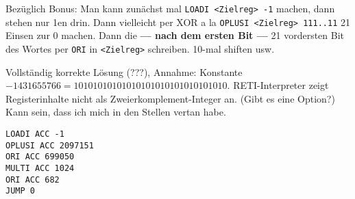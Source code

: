 \begin{solution}
Bezüglich Bonus: Man kann zunächst mal \texttt{LOADI <Zielreg> -1} machen, dann stehen nur 1en drin.
Dann vielleicht per XOR a la \texttt{OPLUSI <Zielreg> 111..11} 21 Einsen zur 0 machen.
Dann die \textbf{--- nach dem ersten Bit ---} 21 vordersten Bit des Wortes per \texttt{ORI} in \texttt{<Zielreg>} schreiben.
10-mal shiften usw.

Vollständig korrekte Lösung {\color{blue}(???)}, Annahme: Konstante $-1431655766 = 10101010101010101010101010101010$.
{\color{blue}RETI-Interpreter zeigt Registerinhalte nicht als Zweierkomplement-Integer an. (Gibt es eine Option?)
Kann sein, dass ich mich in den Stellen vertan habe.}
\begin{verbatim}
LOADI ACC -1
OPLUSI ACC 2097151
ORI ACC 699050
MULTI ACC 1024
ORI ACC 682
JUMP 0
\end{verbatim}

\end{solution}

\begin{sketch}


\end{sketch}

